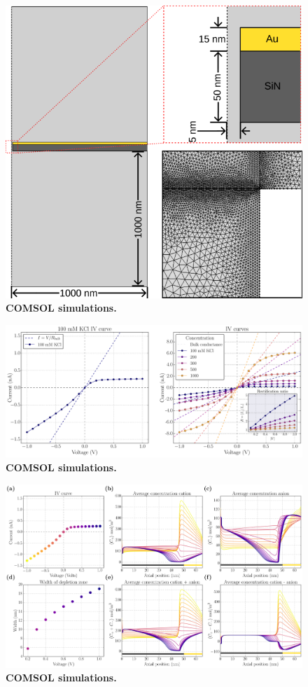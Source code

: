 		\begin{figure}
			\includegraphics[width=\textwidth]{comsol_model}
			\caption{\textbf{COMSOL simulations.}}
			\label{fig:comsolmodel}
		\end{figure}
		
		\begin{figure}
			\includegraphics[width=\textwidth]{comsol1}
			\caption{\textbf{COMSOL simulations.}}
			\label{fig:comsol1}
		\end{figure}
		
		\begin{figure}
			\includegraphics[width=\textwidth]{comsol2}
			\caption{\textbf{COMSOL simulations.}}
			\label{fig:comsol2}
		\end{figure}
		
